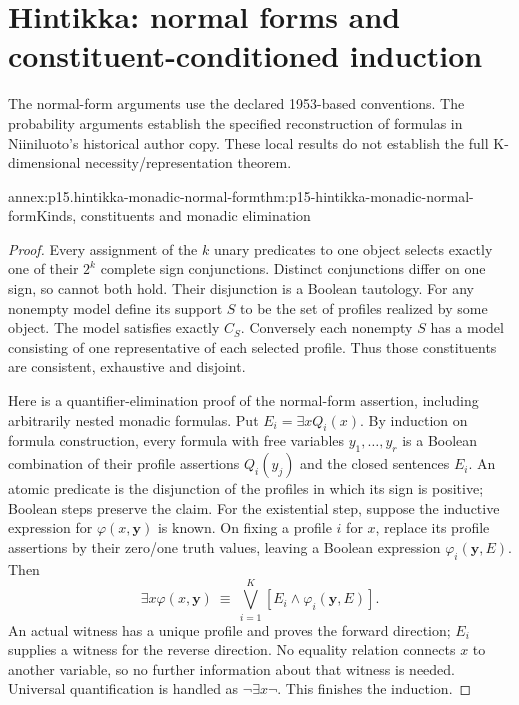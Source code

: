 \section{Hintikka: normal forms and constituent-conditioned induction}
\label{sec:annex-p15-hintikka-inductive-logic}

The normal-form arguments use the declared 1953-based conventions.
The probability arguments establish the specified reconstruction of
formulas in Niiniluoto's historical author copy. These local results do
not establish the full K-dimensional necessity/representation theorem.

\begin{annexitem}{annex:p15.hintikka-monadic-normal-form}{thm:p15-hintikka-monadic-normal-form}{Kinds, constituents and monadic elimination}
\begin{proof}
Every assignment of the \(k\) unary predicates to one object selects
exactly one of their \(2^k\) complete sign conjunctions. Distinct
conjunctions differ on one sign, so cannot both hold. Their disjunction
is a Boolean tautology. For any nonempty model define its support
\(S\) to be the set of profiles realized by some object. The model
satisfies exactly \(C_S\). Conversely each nonempty \(S\) has a
model consisting of one representative of each selected profile.
Thus those constituents are consistent, exhaustive and disjoint.

Here is a quantifier-elimination proof of the normal-form assertion,
including arbitrarily nested monadic formulas. Put
\(E_i=\exists x Q_i(x)\). By induction on formula construction,
every formula with free variables \(y_1,\ldots,y_r\) is a Boolean
combination of their profile assertions \(Q_i(y_j)\) and the closed
sentences \(E_i\). An atomic predicate is the disjunction of the
profiles in which its sign is positive; Boolean steps preserve the
claim. For the existential step, suppose the inductive expression for
\(\varphi(x,\boldsymbol y)\) is known. On fixing a profile \(i\)
for \(x\), replace its profile assertions by their zero/one truth
values, leaving a Boolean expression \(\varphi_i(\boldsymbol y,E)\).
Then
\[
 \exists x\varphi(x,\boldsymbol y)
 \ \equiv\ \bigvee_{i=1}^K
       [E_i\land\varphi_i(\boldsymbol y,E)].
\]
An actual witness has a unique profile and proves the forward direction;
\(E_i\) supplies a witness for the reverse direction. No equality
relation connects \(x\) to another variable, so no further information
about that witness is needed. Universal quantification is handled as
\(\neg\exists x\neg\). This finishes the induction.


\end{proof}
\end{annexitem}
